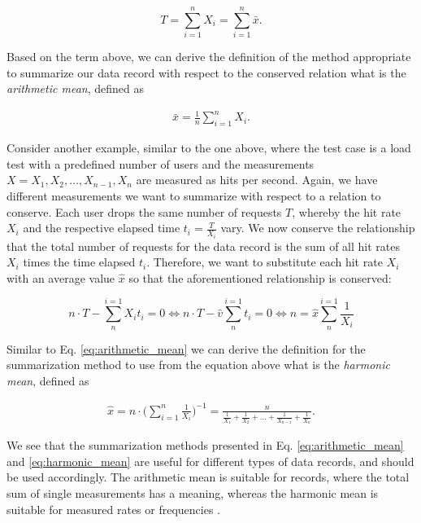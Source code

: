 $$
T = \sum_{i = 1}^{n} X_i = \sum_{i = 1}^{n} \bar{x}.
$$

Based on the term above, we can derive the definition of the method
appropriate to summarize our data record with respect to the conserved relation
what is the \emph{arithmetic mean}, defined as

\begin{equation} \label{eq:arithmetic_mean}
\begin{split}
\bar{x} = \frac{1}{n} \sum_{i = 1}^{n} X_i.
\end{split}
\end{equation}

Consider another example, similar to the one above, where the test
case is a load test with a predefined number of users and the measurements $X =
X_1, X_2, \ldots, X_{n-1}, X_n$ are
measured as hits per second. Again, we have different measurements we want to
summarize with respect to a relation to conserve. Each user drops the same
number of requests $T$, whereby the hit rate $X_i$ and the respective elapsed
time $t_i = \frac{T}{X_i }$ vary. We now conserve the relationship that the
total number of requests for the data record is the sum of all hit rates $X_i$
times the time elapsed $t_i$. Therefore, we want to substitute each hit rate
$X_i$ with an average value $\hat{x}$ so that the aforementioned relationship is
conserved:

$$
n\cdot T - \sum_{n}^{i=1} X_it_i = 0 \Leftrightarrow n\cdot T - \hat{v}
\sum_{n}^{i=1} t_i = 0 \Leftrightarrow n = \hat{x} \sum_{n}^{i=1} \frac{1}{X_i}
$$

Similar to Eq. \ref{eq:arithmetic_mean} we can derive the definition for the summarization
method to use from the equation above what is the \emph{harmonic mean}, defined as

\begin{equation} \label{eq:harmonic_mean}
\begin{split}
\hat{x} = n \cdot \bigg(\sum_{i=1}^{n} \frac{1}{X_i}\bigg)^{-1} =
\frac{n}{\frac{1}{X_1} + \frac{1}{X_2} + \ldots +
\frac{1}{X_{n-1}} + \frac{1}{X_n}}.
\end{split}
\end{equation}

We see that the summarization methods presented in Eq. \ref{eq:arithmetic_mean}
and \ref{eq:harmonic_mean} are useful for different types of data records, and
should be used accordingly. The arithmetic mean is suitable for records, where the total sum of single
measurements has a meaning, whereas the harmonic mean is suitable for measured
rates or frequencies \citep{smith_characterizing_1988}.

